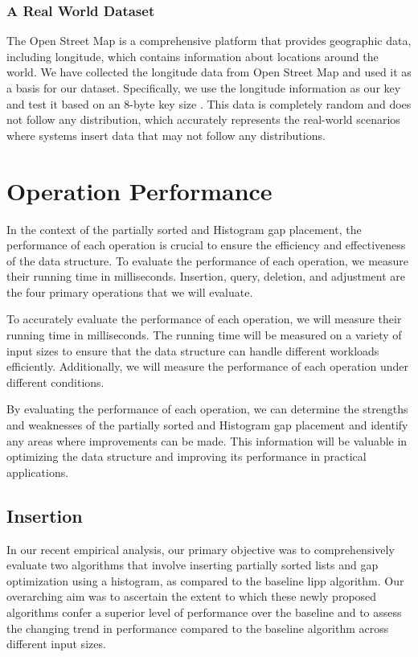 \subsubsection{A Real World Dataset}
The Open Street Map is a comprehensive platform that provides geographic data, including longitude, which contains information about locations around the world. We have collected the longitude data from Open Street Map and used it as a basis for our dataset. Specifically, we use the longitude information as our key and test it based on an 8-byte key size \cite{openstreetmaponaws}. This data is completely random and does not follow any distribution, which accurately represents the real-world scenarios where systems insert data that may not follow any distributions.


\section{Operation Performance}
In the context of the partially sorted \learnindex and Histogram gap placement, the performance of each operation is crucial to ensure the efficiency and effectiveness of the data structure. To evaluate the performance of each operation, we measure their running time in milliseconds. Insertion, query, deletion, and adjustment are the four primary operations that we will evaluate. 

To accurately evaluate the performance of each operation, we will measure their running time in milliseconds. The running time will be measured on a variety of input sizes to ensure that the data structure can handle different workloads efficiently. Additionally, we will measure the performance of each operation under different conditions. 

By evaluating the performance of each operation, we can determine the strengths and weaknesses of the partially sorted \learnindex and Histogram gap placement and identify any areas where improvements can be made. This information will be valuable in optimizing the data structure and improving its performance in practical applications.
\subsection{Insertion}
In our recent empirical analysis, our primary objective was to comprehensively evaluate two algorithms that involve inserting partially sorted lists and gap optimization using a histogram, as compared to the baseline \acrshort{lipp} algorithm. Our overarching aim was to ascertain the extent to which these newly proposed algorithms confer a superior level of performance over the baseline and to assess the changing trend in performance compared to the baseline algorithm across different input sizes.

